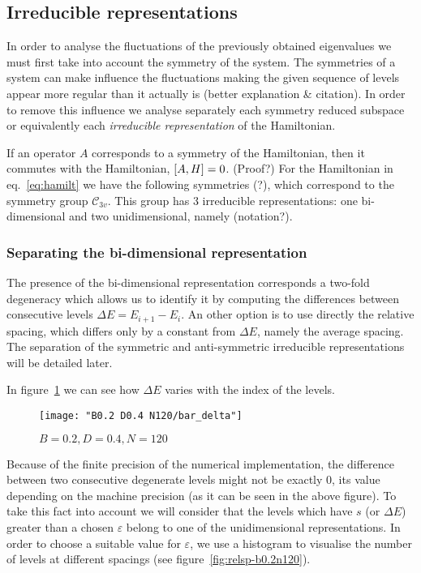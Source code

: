 \documentclass[../thesis.tex]{subfiles}
\begin{document}
\subsection{Irreducible representations}

In order to analyse the fluctuations of the previously obtained eigenvalues
we must first take into account the symmetry of the system. The symmetries of
a system can make influence the fluctuations making the given sequence of levels
appear more regular than it actually is {\color{red} (better explanation \& citation)}.
In order to remove this influence we analyse separately each symmetry reduced subspace
or equivalently each \emph{irreducible representation} of the Hamiltonian.

If an operator $A$ corresponds to a symmetry of the Hamiltonian, then it
commutes with the Hamiltonian, \(\comm{A}{H} = 0\). {\color{red} (Proof?)}
For the Hamiltonian in eq.~\eqref{eq:hamilt} we have the following symmetries {\color{red} (?)},
which correspond to the symmetry group \(\mathcal{C}_{3v}\).
This group has 3 irreducible representations: one bi-dimensional and
two unidimensional, namely {\color{red} (notation?)}.

\subsubsection{Separating the bi-dimensional representation}

The presence of the bi-dimensional representation corresponds a two-fold
degeneracy which allows us to identify it by computing the
differences between consecutive levels \(\Delta E = E_{i+1} - E_i\).
An other option is to use directly the relative spacing, which differs only by a
constant from \(\Delta E\), namely the average spacing.
The separation of the symmetric and anti-symmetric irreducible representations
will be detailed later.

In figure~\ref{fig:bar_delta} we can see how \(\Delta E\) varies with the index of the
levels.

\begin{figure}[!h]
  \centering
  \texttt{[image: "B0.2 D0.4 N120/bar\_delta"]}   %
  \caption{\(B=0.2, D=0.4, N=120\)}%
\label{fig:bar_delta}
\end{figure}

Because of the finite precision of the numerical implementation, the
difference between two consecutive degenerate levels might not be exactly 0,
its value depending on the machine precision (as it can be seen in the above figure).
To take this fact into account we will consider that the levels which
have $s$ (or \(\Delta E\)) greater than a chosen \( \varepsilon \) belong
to one of the unidimensional representations.
In order to choose a suitable value for \( \varepsilon \), we use a histogram
to visualise the number of levels at different spacings
(see figure~\ref{fig:relsp-b0.2n120}).
\end{document}
